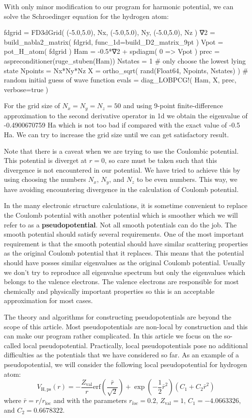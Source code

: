 With only minor modification to our program for harmonic potential, we can solve the Schroedinger
equation for the hydrogen atom:
\begin{juliacode}
fdgrid = FD3dGrid( (-5.0,5.0), Nx, (-5.0,5.0), Ny, (-5.0,5.0), Nz )
∇2 = build_nabla2_matrix( fdgrid, func_1d=build_D2_matrix_9pt )
Vpot = pot_H_atom( fdgrid )
Ham = -0.5*∇2 + spdiagm( 0 => Vpot )
prec = aspreconditioner(ruge_stuben(Ham))
Nstates = 1  # only choose the lowest lying state
Npoints = Nx*Ny*Nz
X = ortho_sqrt( rand(Float64, Npoints, Nstates) ) # random initial guess of wave function
evals = diag_LOBPCG!( Ham, X, prec, verbose=true )
\end{juliacode}

For the grid size of $N_{x}=N_{y}=N_{z}=50$ and using 9-point finite-difference approximation
to the second derivative operator in 1d we obtain the eigenvalue of -0.4900670759 Ha which
is not too bad if compared with the exact value of -0.5 Ha. We can try to increase the grid
size until we can get satisfactory result.

Note that there is a caveat when we are trying to use the Coulombic potential. This potential
is diverget at $r=0$, so care must be taken such that this divergence is not encountered in
our potential. We have tried to achieve this by using choosing the numbers
$N_{x}$, $N_{y}$, and $N_{z}$ to be even numbers. This way, we have avoiding encountering
divergence in the calculation of Coulomb potential.

In the many electronic structure calculations, it is sometime convenient to replace the
Coulomb potential with another potential which is smoother which we
will refer to as a \textbf{pseudopotential}. Not all smooth
potentials can do the job. The smooth potential should satisfy several requirements.
One of the most important requirement is that the smooth potential should have similar
scattering properties as the original Coulomb potential that it replaces.
This means that the potential should have posses similar eigenvalues as the
original Coulomb potential. Usually we don't try to reproduce all eigenvalue spectrum but only
the eigenvalues which belongs to the valence electrons. The valence electrons are
responsible for most chemically and physically important properties so this is an
acceptable approximation for most cases.

The theory and algorithms for constructing pseudopotentials are beyond the scope of
this article.
Most pseudopotentials are non-local by construction and this can make our program rather
complicated.
In this article we focus on the so-called local pseudopotential. Practically, local
pseudopotentials pose no additional difficulties as the potentials that we have
considered so far. As an example of a pseudopotential, we will consider the following
local pseudopotential for hydrogen atom:
\begin{equation}
V_{\mathrm{H,ps}}(r) = -\frac{Z_{\mathrm{val}}}{r}
\mathrm{erf}\left( \frac{\bar{r}}{\sqrt{2}} \right) +
\exp\left( -\frac{1}{2}\bar{r}^2 \right)
\left( C_{1} + C_{2}\bar{r}^2 \right)
\end{equation}
where $\bar{r}=r/r_{\mathrm{loc}}$ and with the parameters $r_{loc}=0.2$, 
$Z_{\mathrm{val}}=1$, $C_{1}=-4.0663326$, and $C_{2}=0.6678322$.

